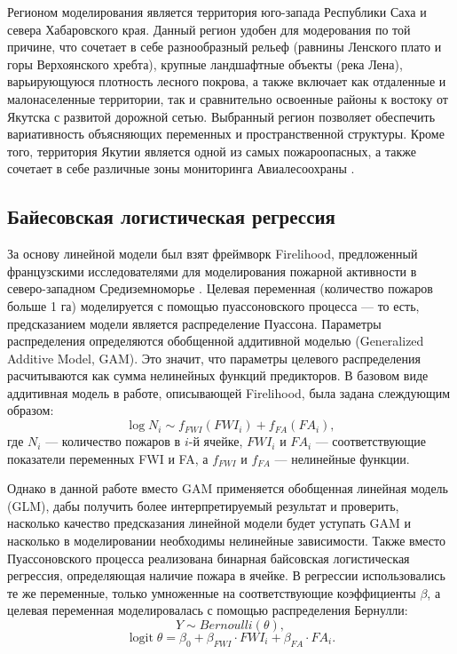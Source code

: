 \documentclass[a4paper,article,14pt]{extarticle}
\DeclareMathOperator{\logit}{logit}
\begin{document}
Регионом моделирования является территория юго-запада Республики Саха и севера Хабаровского края. Данный регион удобен для модерования по той причине, что сочетает в себе разнообразный рельеф (равнины Ленского плато и горы Верхоянского хребта), крупные ландшафтные объекты (река Лена), варьирующуюся плотность лесного покрова, а также включает как отдаленные и малонаселенные территории, так и сравнительно освоенные районы к востоку от Якутска с развитой дорожной сетью. Выбранный регион позволяет обеспечить вариативность объясняющих переменных и пространственной структуры. Кроме того, территория Якутии является одной из самых пожароопасных, а также сочетает в себе различные зоны мониторинга Авиалесоохраны \cite{ShemyRaspolozheniyaZona}.


\subsection{Байесовская логистическая регрессия}

За основу линейной модели был взят фреймворк Firelihood, предложенный французскими исследователями для моделирования пожарной активности в северо-западном Средиземноморье \cite{PimontPredictionRegionalWildfire2021}. Целевая переменная (количество пожаров больше 1 га) моделируется с помощью пуассоновского процесса — то есть, предсказанием модели является распределение Пуассона. Параметры распределения определяются обобщенной аддитивной моделью (Generalized Additive Model, GAM). Это значит, что параметры целевого распределения расчитываются как сумма нелинейных функций предикторов. В базовом виде аддитивная модель в работе, описывающей Firelihood, была задана слеждующим образом: 
\begin{equation}
	\log{N_i}\sim f_{FWI}(FWI_i)+f_{FA}(FA_i),
\end{equation}
где $N_i$ — количество пожаров в $i$-й ячейке, $FWI_i$ и $FA_i$ — соответствующие показатели переменных FWI и FA, а $f_{FWI}$ и $f_{FA}$ — нелинейные функции.

Однако в данной работе вместо GAM применяется обобщенная линейная модель (GLM), дабы получить более интерпретируемый результат и проверить, насколько качество предсказания линейной модели будет уступать GAM и насколько в моделировании необходимы нелинейные зависимости. Также вместо Пуассоновского процесса реализована бинарная байсовская логистическая регрессия, определяющая наличие пожара в ячейке. В регрессии использовались те же переменные, только умноженные на соответствующие коэффициенты $\beta$, а целевая переменная моделировалась с помощью распределения Бернулли:
\begin{equation}
	Y\sim Bernoulli(\theta),
\end{equation}
\begin{equation}
	\logit{\theta}= \beta_0 +\beta_{FWI}\cdot FWI_i+\beta_{FA}\cdot FA_i.	
\end{equation}
\end{document}
